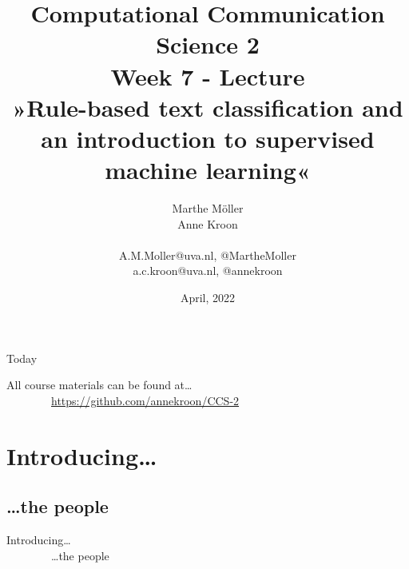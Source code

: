 \documentclass[handout]{beamer}
\title[Computational Communication Science 2]{\textbf{Computational Communication Science 2} \\Week 7 - Lecture\\ »Rule-based text classification and an introduction to supervised machine learning«}
\author[Marthe Möller, Anne Kroon]{Marthe Möller \\ Anne Kroon \\ ~ \\ \footnotesize{A.M.Moller@uva.nl, @MartheMoller \\a.c.kroon@uva.nl, @annekroon} \\}
\date{April, 2022}
\institute[Digital Society Minor, University of Amsterdam]{Digital Society Minor, University of Amsterdam}
\begin{document}
	
	\begin{frame}{}
		\titlepage
	\end{frame}
	
	\begin{frame}{Today}
		\tableofcontents
	\end{frame}

\begin{frame} 
	All course materials can be found at\ldots \\
	~~~~~~~~\url{https://github.com/annekroon/CCS-2}
\end{frame}

\section{Introducing\ldots}
\subsection{\ldots the people}

\begin{frame} 
	Introducing\ldots \\
	~~~~~~~~\ldots the people
\end{frame}
\end{document}
